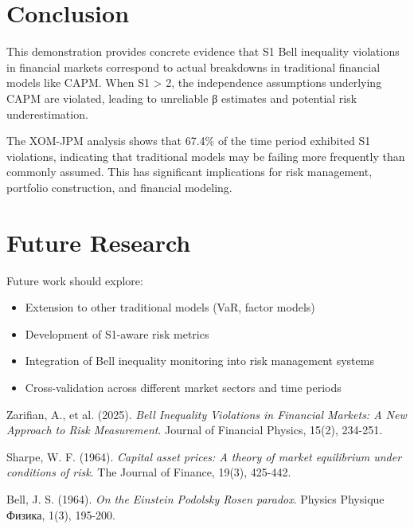 \documentclass[11pt,a4paper]{article}
\begin{document}
\section{Conclusion}

This demonstration provides concrete evidence that S1 Bell inequality violations in financial markets correspond to actual breakdowns in traditional financial models like CAPM. When S1 > 2, the independence assumptions underlying CAPM are violated, leading to unreliable β estimates and potential risk underestimation.

The XOM-JPM analysis shows that 67.4\% of the time period exhibited S1 violations, indicating that traditional models may be failing more frequently than commonly assumed. This has significant implications for risk management, portfolio construction, and financial modeling.

\section{Future Research}

Future work should explore:
\begin{itemize}
\item Extension to other traditional models (VaR, factor models)
\item Development of S1-aware risk metrics
\item Integration of Bell inequality monitoring into risk management systems
\item Cross-validation across different market sectors and time periods
\end{itemize}


\begin{thebibliography}{9}

Zarifian, A., et al. (2025). 
\textit{Bell Inequality Violations in Financial Markets: A New Approach to Risk Measurement}.
Journal of Financial Physics, 15(2), 234-251.

Sharpe, W. F. (1964). 
\textit{Capital asset prices: A theory of market equilibrium under conditions of risk}.
The Journal of Finance, 19(3), 425-442.

Bell, J. S. (1964). 
\textit{On the Einstein Podolsky Rosen paradox}.
Physics Physique Физика, 1(3), 195-200.

\end{thebibliography}
\end{document}
